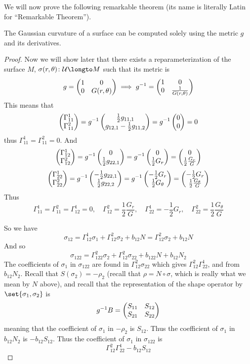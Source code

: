 We will now prove the following remarkable theorem (its name is literally Latin for ``Remarkable Theorem'').

\begin{thrm*}

    The Gaussian curvature of a surface can be computed solely using the metric $g$ and its derivatives.

\end{thrm*}

\begin{proof}

    Now we will show later that there exists a reparameterization of the surface $M$, $\sigma(r,\theta)\colon\mU\longto M$ such that its metric is
    \[ g = \begin{pmatrix}1 & 0 \\ 0 & G(r,\theta)\end{pmatrix} \implies g^{-1} = \begin{pmatrix}1 & 0 \\ 0 & \frac1{G(r,\theta)}\end{pmatrix} \]
    This means that
    \[ \begin{pmatrix}\Gamma_{11}^1 \\ \Gamma_{11}^2\end{pmatrix} = g^{-1}\begin{pmatrix}\frac12g_{11,1} \\ g_{12,1} - \frac12g_{11,2}\end{pmatrix} = g^{-1}\begin{pmatrix}0 \\ 0\end{pmatrix} = 0 \]
    thus $\Gamma_{11}^1=\Gamma_{11}^2=0$.
    And
    \begin{gather*}
        \begin{pmatrix}\Gamma_{12}^1 \\ \Gamma_{12}^2\end{pmatrix} = g^{-1}\begin{pmatrix}0 \\ \frac12g_{22,1}\end{pmatrix} = g^{-1}\begin{pmatrix}0 \\ \frac12 G_r\end{pmatrix} = \begin{pmatrix}0 \\ \frac12\frac{G_r}G\end{pmatrix} \\[3pt]
        \begin{pmatrix}\Gamma_{22}^1 \\ \Gamma_{22}^2\end{pmatrix} = g^{-1}\begin{pmatrix}-\frac12g_{22,1}\\\frac12g_{22,2}\end{pmatrix} = g^{-1}\begin{pmatrix}-\frac12 G_r \\ \frac12 G_\theta\end{pmatrix} = \begin{pmatrix}-\frac12 G_r \\ \frac12 \frac{G_\theta}G\end{pmatrix}
    \end{gather*}
    Thus
    \[ \Gamma_{11}^1 = \Gamma_{11}^2 = \Gamma_{12}^1 = 0,\quad \Gamma_{12}^2 = \frac12\frac{G_r}G,\quad \Gamma_{22}^1 = -\frac12G_r,\quad \Gamma_{22}^2 = \frac12\frac{G_\theta}G \]
    
    So we have
    \[ \sigma_{12} = \Gamma_{12}^1\sigma_1 + \Gamma_{12}^2\sigma_2 + b_{12}N = \Gamma_{12}^2\sigma_2 + b_{12}N \]
    And so
    \[ \sigma_{122} = \Gamma_{122}^2\sigma_2 + \Gamma_{12}^2\sigma_{22} + b_{122}N + b_{12}N_2 \]
    The coefficients of $\sigma_1$ in $\sigma_{122}$ are found in $\Gamma_{12}^2\sigma_{22}$ which gives $\Gamma_{12}^2\Gamma_{22}^1$, and from $b_{12}N_2$.
    Recall that $S(\sigma_2)=-\rho_2$ (recall that $\rho=N\circ\sigma$, which is really what we mean by $N$ above), and recall that the representation of the shape operator by $\set{\sigma_1,\sigma_2}$ is
    \[ g^{-1}B = \begin{pmatrix}S_{11} & S_{12} \\ S_{21} & S_{22}\end{pmatrix} \]
    meaning that the coefficient of $\sigma_1$ in $-\rho_2$ is $S_{12}$.
    Thus the coefficient of $\sigma_1$ in $b_{12}N_2$ is $-b_{12}S_{12}$.
    Thus the coefficient of $\sigma_1$ in $\sigma_{122}$ is
    \[ \Gamma_{12}^2\Gamma_{22}^1 - b_{12}S_{12} \]
    

\end{proof}
